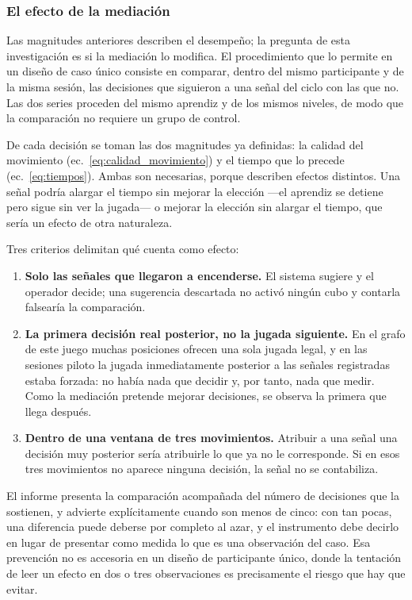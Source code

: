 \documentclass{book}
\begin{document}
\subsubsection*{El efecto de la mediación}

Las magnitudes anteriores describen el desempeño; la pregunta de esta
investigación es si la mediación lo modifica. El procedimiento que lo
permite en un diseño de caso único consiste en comparar, dentro del
mismo participante y de la misma sesión, las decisiones que siguieron
a una señal del ciclo con las que no. Las dos series proceden del
mismo aprendiz y de los mismos niveles, de modo que la comparación no
requiere un grupo de control.

De cada decisión se toman las dos magnitudes ya definidas: la calidad
del movimiento (ec.~\ref{eq:calidad_movimiento}) y el tiempo que lo
precede (ec.~\ref{eq:tiempos}). Ambas son necesarias, porque describen
efectos distintos. Una señal podría alargar el tiempo sin mejorar la
elección —el aprendiz se detiene pero sigue sin ver la jugada— o
mejorar la elección sin alargar el tiempo, que sería un efecto de otra
naturaleza.

Tres criterios delimitan qué cuenta como efecto:

\begin{enumerate}
    \item \textbf{Solo las señales que llegaron a encenderse.} El sistema
    sugiere y el operador decide; una sugerencia descartada no activó
    ningún cubo y contarla falsearía la comparación.

    \item \textbf{La primera decisión real posterior, no la jugada
    siguiente.} En el grafo de este juego muchas posiciones ofrecen una
    sola jugada legal, y en las sesiones piloto la jugada inmediatamente
    posterior a las señales registradas estaba forzada: no había nada
    que decidir y, por tanto, nada que medir. Como la mediación pretende
    mejorar decisiones, se observa la primera que llega después.

    \item \textbf{Dentro de una ventana de tres movimientos.} Atribuir a
    una señal una decisión muy posterior sería atribuirle lo que ya no
    le corresponde. Si en esos tres movimientos no aparece ninguna
    decisión, la señal no se contabiliza.
\end{enumerate}

El informe presenta la comparación acompañada del número de decisiones
que la sostienen, y advierte explícitamente cuando son menos de cinco:
con tan pocas, una diferencia puede deberse por completo al azar, y el
instrumento debe decirlo en lugar de presentar como medida lo que es
una observación del caso. Esa prevención no es accesoria en un diseño
de participante único, donde la tentación de leer un efecto en dos o
tres observaciones es precisamente el riesgo que hay que evitar.
\end{document}

